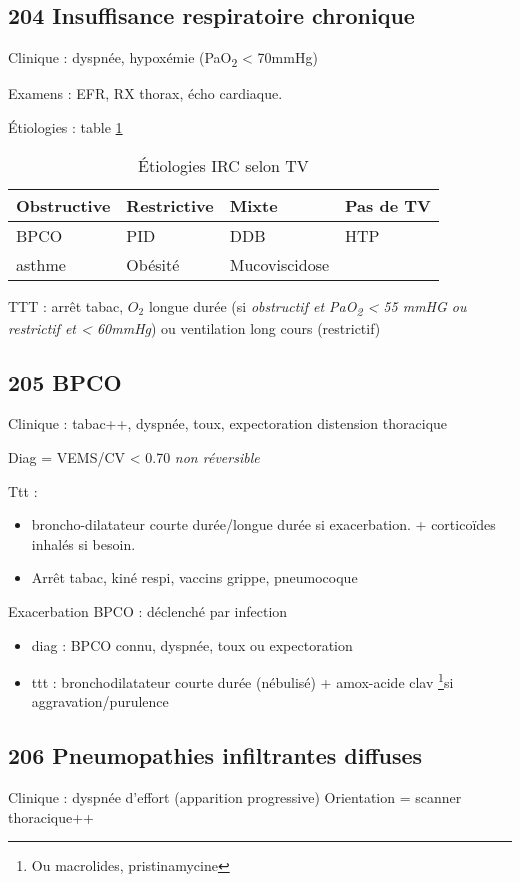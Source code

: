 \documentclass[11pt]{article}
\begin{document}
\subsection{204 Insuffisance respiratoire chronique}
\label{sec:orgbbfb660}
Clinique : dyspnée, hypoxémie (PaO\textsubscript{2} < 70mmHg)

Examens : EFR, RX thorax, écho cardiaque.

Étiologies : table \ref{tab:org499d095}

\begin{table}[htbp]
\caption{\label{tab:org499d095}Étiologies IRC selon TV}
\centering
\begin{tabular}{llll}
Obstructive & Restrictive & Mixte & Pas de TV\\
\hline
BPCO & PID & DDB & HTP\\
asthme & Obésité & Mucoviscidose & \\
\end{tabular}
\end{table}

TTT : arrêt tabac, \(O_2\) longue durée (si \emph{obstructif et PaO\textsubscript{2} < 55 mmHG ou
   restrictif et < 60mmHg}) ou ventilation long cours (restrictif)
\subsection{205 BPCO}
\label{sec:orgda128b0}

Clinique : tabac++, dyspnée, toux, expectoration \textpm{} distension thoracique 

Diag = VEMS/CV < 0.70 \emph{non réversible}

Ttt : 
\begin{itemize}
\item broncho-dilatateur courte durée/longue durée si exacerbation. + corticoïdes
inhalés si besoin.
\item Arrêt tabac, kiné respi, vaccins grippe, pneumocoque
\end{itemize}

Exacerbation BPCO : déclenché par infection
\begin{itemize}
\item diag : BPCO connu, \inc dyspnée, toux ou expectoration
\item ttt : bronchodilatateur courte durée (nébulisé) + amox-acide clav \footnote{Ou macrolides, pristinamycine}si
aggravation/\inc purulence
\end{itemize}
\subsection{206 Pneumopathies infiltrantes diffuses}
\label{sec:orgf083101}
Clinique : dyspnée d'effort (apparition progressive)
   Orientation = scanner thoracique++
\end{document}
